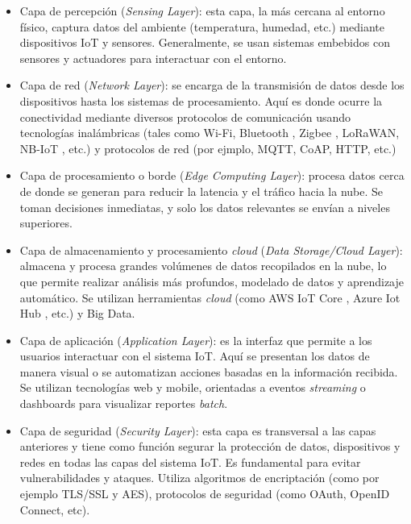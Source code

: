 \begin{itemize}

	\item Capa de percepción (\textit{Sensing Layer}): esta capa, la más cercana al entorno físico, captura datos del ambiente (temperatura, humedad, etc.) mediante dispositivos IoT y sensores. Generalmente, se usan sistemas embebidos con sensores y actuadores para interactuar con el entorno.
	
	\item Capa de red (\textit{Network Layer}): se encarga de la transmisión de datos desde los dispositivos hasta los sistemas de procesamiento. Aquí es donde ocurre la conectividad mediante diversos protocolos de comunicación usando tecnologías inalámbricas (tales como Wi-Fi, Bluetooth \citep{Bluetooth}, Zigbee \citep{zigbee}, LoRaWAN, NB-IoT \citep{Narrowband_IoT}, etc.) y protocolos de red (por ejmplo, MQTT, CoAP, HTTP, etc.)
	
	\item Capa de procesamiento o borde (\textit{Edge Computing Layer}): procesa datos cerca de donde se generan para reducir la latencia y el tráfico hacia la nube. Se toman decisiones inmediatas, y solo los datos relevantes se envían a niveles superiores. 
	
	\item Capa de almacenamiento y procesamiento \textit{cloud} (\textit{Data Storage/Cloud Layer}): almacena y procesa grandes volúmenes de datos recopilados en la nube, lo que permite realizar análisis más profundos, modelado de datos y aprendizaje automático. Se utilizan herramientas \textit{cloud} (como AWS IoT Core \citep{aws_iot_core}, Azure Iot Hub \citep{azure_iot}, etc.) y Big Data.
	
	\item Capa de aplicación (\textit{Application Layer}): es la interfaz que permite a los usuarios interactuar con el sistema IoT. Aquí se presentan los datos de manera visual o se automatizan acciones basadas en la información recibida. Se utilizan tecnologías web y mobile, orientadas a eventos \textit{streaming} o dashboards para visualizar reportes \textit{batch}.
	
	\item Capa de seguridad (\textit{Security Layer}): esta capa es transversal a las capas anteriores y tiene como función segurar la protección de datos, dispositivos y redes en todas las capas del sistema IoT. Es fundamental para evitar vulnerabilidades y ataques. Utiliza algoritmos de encriptación (como por ejemplo TLS/SSL y AES), protocolos de seguridad (como OAuth, OpenID Connect, etc).
	
\end{itemize}


